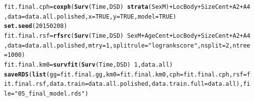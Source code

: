 \documentclass{article}\usepackage[]{graphicx}\usepackage[]{color}
\makeatletter
\newcommand{\hlnum}[1]{\textcolor[rgb]{0.686,0.059,0.569}{#1}}%
\newcommand{\hlstr}[1]{\textcolor[rgb]{0.192,0.494,0.8}{#1}}%
\newcommand{\hlopt}[1]{\textcolor[rgb]{0,0,0}{#1}}%
\newcommand{\hlstd}[1]{\textcolor[rgb]{0.345,0.345,0.345}{#1}}%
\newcommand{\hlkwb}[1]{\textcolor[rgb]{0.69,0.353,0.396}{#1}}%
\newcommand{\hlkwc}[1]{\textcolor[rgb]{0.333,0.667,0.333}{#1}}%
\newcommand{\hlkwd}[1]{\textcolor[rgb]{0.737,0.353,0.396}{\textbf{#1}}}%
\newenvironment{kframe}{%
 \def\at@end@of@kframe{}%
 \ifinner\ifhmode%
  \def\at@end@of@kframe{\end{minipage}}%
  \begin{minipage}{\columnwidth}%
 \fi\fi%
 \def\FrameCommand##1{\hskip\@totalleftmargin \hskip-\fboxsep
 \colorbox{shadecolor}{##1}\hskip-\fboxsep
     \hskip-\linewidth \hskip-\@totalleftmargin \hskip\columnwidth}%
 \MakeFramed {\advance\hsize-\width
   \@totalleftmargin\z@ \linewidth\hsize
   \@setminipage}}%
 {\par\unskip\endMakeFramed%
 \at@end@of@kframe}
\newenvironment{knitrout}{}{} %
\makeatother
\begin{document}
\begin{knitrout}
\begin{kframe}
\begin{alltt}
\hlstd{fit.final.cph} \hlkwb{=} \hlkwd{coxph}\hlstd{(}\hlkwd{Surv}\hlstd{(Time, DSD)} \hlopt{~} \hlkwd{strata}\hlstd{(SexM)} \hlopt{+} \hlstd{LocBody} \hlopt{+} \hlstd{SizeCent} \hlopt{+} \hlstd{A2} \hlopt{+} \hlstd{A4,} \hlkwc{data} \hlstd{= data.all.polished,} \hlkwc{x} \hlstd{=} \hlnum{TRUE}\hlstd{,} \hlkwc{y} \hlstd{=} \hlnum{TRUE}\hlstd{,} \hlkwc{model} \hlstd{=} \hlnum{TRUE}\hlstd{)}
\hlkwd{set.seed}\hlstd{(}\hlnum{20150208}\hlstd{)}
\hlstd{fit.final.rsf} \hlkwb{=} \hlkwd{rfsrc}\hlstd{(}\hlkwd{Surv}\hlstd{(Time, DSD)} \hlopt{~} \hlstd{SexM} \hlopt{+} \hlstd{AgeCent} \hlopt{+} \hlstd{LocBody} \hlopt{+} \hlstd{SizeCent} \hlopt{+} \hlstd{A2} \hlopt{+} \hlstd{A4,} \hlkwc{data} \hlstd{= data.all.polished,} \hlkwc{mtry} \hlstd{=} \hlnum{1}\hlstd{,} \hlkwc{splitrule} \hlstd{=} \hlstr{"logrankscore"}\hlstd{,} \hlkwc{nsplit} \hlstd{=} \hlnum{2}\hlstd{,} \hlkwc{ntree} \hlstd{=} \hlnum{1000}\hlstd{)}
\hlstd{fit.final.km0} \hlkwb{=} \hlkwd{survfit}\hlstd{(}\hlkwd{Surv}\hlstd{(Time, DSD)} \hlopt{~} \hlnum{1}\hlstd{, data.all)}
\hlkwd{saveRDS}\hlstd{(}\hlkwd{list}\hlstd{(}\hlkwc{gg} \hlstd{= fit.final.gg,} \hlkwc{km0} \hlstd{= fit.final.km0,} \hlkwc{cph} \hlstd{= fit.final.cph,} \hlkwc{rsf} \hlstd{= fit.final.rsf,} \hlkwc{data.train} \hlstd{= data.all.polished,} \hlkwc{data.train.full} \hlstd{= data.all),} \hlkwc{file} \hlstd{=} \hlstr{"05_final_model.rds"}\hlstd{)}


\end{alltt}
\end{kframe}
\end{knitrout}
\end{document}
